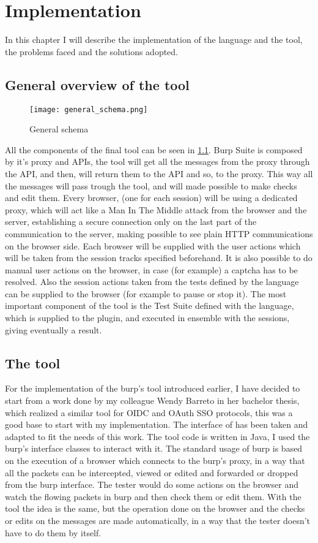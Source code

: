 \chapter{Implementation}
In this chapter I will describe the implementation of the language and the tool, the problems faced and the solutions adopted.

\section{General overview of the tool}
\begin{figure}
    \texttt{[image: general\_schema.png]}
    \caption{General schema}
    \label{fig:general_schema}
\end{figure}

All the components of the final tool can be seen in \ref{fig:general_schema}. Burp Suite is composed by it's proxy and APIs, the tool will get all the messages from the proxy through the API, and then, will return them to the API and so, to the proxy. This way all the messages will pass trough the tool, and will made possible to make checks and edit them.
Every browser, (one for each session) will be using a dedicated proxy, which will act like a Man In The Middle attack from the browser and the server, establishing a secure connection only on the last part of the communication to the server, making possible to see plain HTTP communications on the browser side. Each browser will be supplied with the user actions which will be taken from the session tracks specified beforehand. It is also possible to do manual user actions on the browser, in case (for example) a captcha has to be resolved. Also the session actions taken from the tests defined by the language can be supplied to the browser (for example to pause or stop it). The most important component of the tool is the Test Suite defined with the language, which is supplied to the plugin, and executed in ensemble with the sessions, giving eventually a result.

\section{The tool}
For the implementation of the \Gls{burp}'s tool introduced earlier, I have decided to start from a work done by my colleague Wendy Barreto \cite{wendy_barreto} in her bachelor thesis, which realized a similar tool for \Gls{OIDC} and \Gls{OAuth} SSO protocols, this was a good base to start with my implementation. The interface of \cite{wendy_barreto} has been taken and adapted to fit the needs of this work. The tool code is written in Java, I used the \Gls{burp}'s interface classes to interact with it.
The standard usage of \Gls{burp} is based on the execution of a browser which connects to the \Gls{burp}'s proxy, in a way that all the packets can be intercepted, viewed or edited and forwarded or dropped from the \Gls{burp} interface. The tester would do some actions on the browser and watch the flowing packets in \Gls{burp} and then check them or edit them. With the tool the idea is the same, but the operation done on the browser and the checks or edits on the messages are made automatically, in a way that the tester doesn't have to do them by itself.

